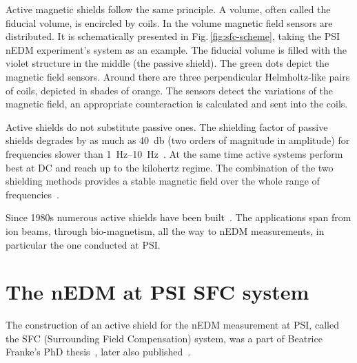 Active magnetic shields follow the same principle. A volume, often called the fiducial volume, is encircled by coils. In the volume magnetic field sensors are distributed. It is schematically presented in Fig.\,\ref{fig:sfc-scheme}, taking the PSI nEDM experiment's system as an example. The fiducial volume is filled with the violet structure in the middle (the passive shield). The green dots depict the magnetic field sensors. Around there are three perpendicular Helmholtz-like pairs of coils, depicted in shades of orange. The sensors detect the variations of the magnetic field, an appropriate counteraction is calculated and sent into the coils.

Active shields do not substitute passive ones. The shielding factor
 of passive shields degrades by as much as \SI{40}{\decibel} (two orders of magnitude in amplitude) for frequencies slower than \SIrange[range-phrase = --]{1}{10}{\hertz}~\cite{Brake1991}. At the same time active systems perform best at DC and reach up to the kilohertz regime. The combination of the two shielding methods provides a stable magnetic field over the whole range of frequencies~\cite{Brake1991,Kelha1982,Voigt2013}.

Since 1980s numerous active shields have been built~\cite{Kelha1982,Brake1991,Spemann2003,Brys2005,Kobayashi2012,Voigt2013,Afach2014}. The applications span from ion beams, through bio-magnetism, all the way to nEDM measurements, in particular the one conducted at PSI\@.




\section{The nEDM at PSI SFC system}
The construction of an active shield for the nEDM measurement at PSI, called the SFC (Surrounding Field Compensation) system,
was a part of Beatrice Franke's PhD thesis~\cite{Franke2013}, later also published~\cite{Afach2014}.

